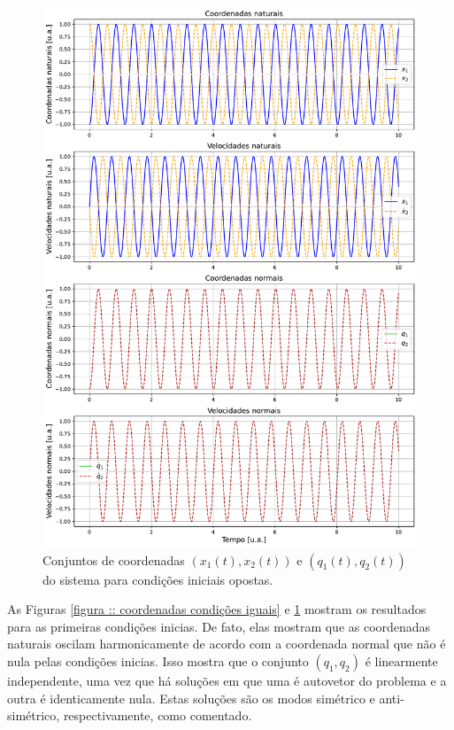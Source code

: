 \documentclass[a4paper, 11pt]{article}
\begin{document}
    \begin{figure}[h!]
        \centering
        \includegraphics[width=1\linewidth]{graph_coordenadas_opostas.pdf}
        \caption{Conjuntos de coordenadas $(x_1(t),x_2(t))$ e $(q_1(t),q_2(t))$ do sistema para condições iniciais opostas.
        \label{figura :: coordenadas condições opostas}}
    \end{figure}

    As Figuras \ref{figura :: coordenadas condições iguais} e \ref{figura :: coordenadas condições opostas} mostram os resultados para as primeiras condições inicias. De fato, elas mostram que as coordenadas naturais oscilam harmonicamente de acordo com a coordenada normal que não é nula pelas condições inicias. Isso mostra que o conjunto $(q_1,q_2)$ é linearmente independente, uma vez que há soluções em que uma é autovetor do problema e a outra é identicamente nula. Estas soluções são os modos simétrico e anti-simétrico, respectivamente, como comentado.
\end{document}
